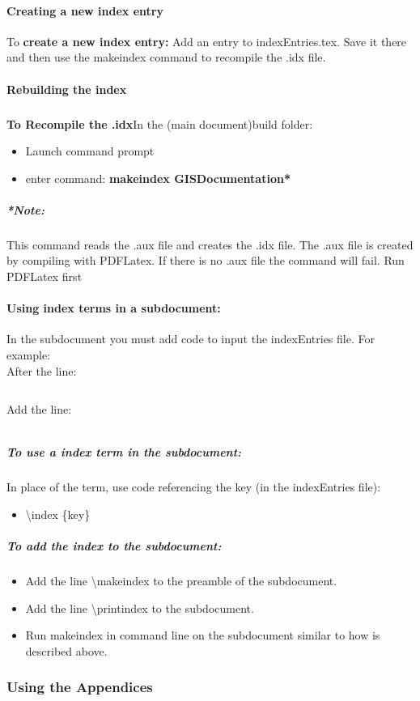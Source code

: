 \documentclass[class=book , crop=false]{standalone}
\begin{document}
\paragraph{Creating a new index entry}
To \textbf{create a new index entry:} Add an entry to indexEntries.tex.  Save it there and then use the makeindex command to recompile the .idx file.

\paragraph{Rebuilding the index}
\subparagraph{}\textbf{To Recompile the .idx}In the (main document)build folder:
\begin{itemize}
\item Launch command prompt
\item enter command: \textbf{{\large makeindex GISDocumentation*}}
\end{itemize}
\subparagraph{*Note:} {\footnotesize This command reads the .aux file and creates the .idx file.  The .aux file is created by compiling with PDFLatex.  If there is no .aux file the command will fail. Run PDFLatex first}

\paragraph{Using index terms in a subdocument:}
In the subdocument you must add code to input the indexEntries file.  For example:\\
After the line:
\begin{verbatim}

\end{verbatim}
Add the line:
\begin{verbatim}

\end{verbatim}

\subparagraph{To use a index term in the subdocument:\texorpdfstring{\\}{}}
In place of the term, use code referencing the key (in the indexEntries file):

\begin{itemize}
\item \textbackslash index \{key\}
\end{itemize}

\subparagraph{To add the index to the subdocument:}
\begin{itemize}
\item Add the line \textbackslash makeindex to the preamble of the subdocument.
\item Add the line \textbackslash printindex to the subdocument.
\item Run makeindex in command line on the subdocument similar to how is described above.

\end{itemize}


\subsubsection[Using the Appendices]{{\Large Using the Appendices}}
\end{document}

